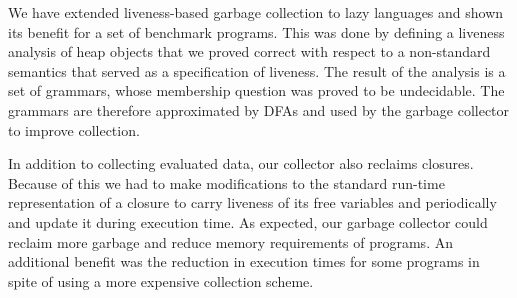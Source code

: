 \documentclass[preprint, 9pt]{sigplanconf}
\begin{document}

We have  extended liveness-based garbage collection  to lazy languages
and shown its benefit for a set of benchmark programs.  This was done
by defining a liveness analysis of heap objects that we proved correct
with  respect   to  a   non-standard  semantics   that  served   as  a
specification of  liveness.  The result  of the  analysis is a  set of
grammars, whose membership question was  proved to be undecidable. The
grammars are  therefore approximated by  DFAs and used by  the garbage
collector to improve collection.

In addition to collecting evaluated  data, our collector also reclaims
closures.   Because  of this  we  had  to  make modifications  to  the
standard run-time representation of a closure to carry liveness of its
free variables and  periodically and update it  during execution time.
As  expected, our  garbage collector  could reclaim  more garbage  and
reduce memory requirements of programs.  An additional benefit was the
reduction in  execution times for  some programs  in spite of  using a
more expensive collection scheme.
\end{document}
